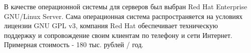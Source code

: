 В качестве операционной системы для серверов был выбран Red Hat Enterprise GNU/Linux Server. Сама операционная система распространяется на условиях лицензии GNU GPL v3, компания Red Hat обеспечивает техническую поддержку и сопровождение своим клиентам по телефону и сети Интернет.
Примерная стоимость - 180 тыс. рублей / год.